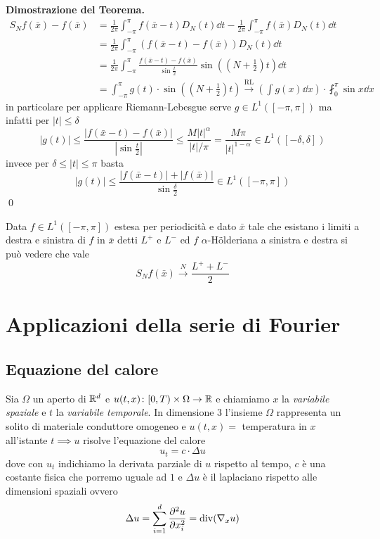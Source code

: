 \textbf{Dimostrazione del Teorema.}
$$
\begin{aligned}
	S_N f(\bar x) - f(\bar x) 
	&= \frac{1}{2\pi} \int_{-\pi}^\pi f(\bar x - t) D_N(t) \dd t - \frac{1}{2\pi} \int_{-\pi}^\pi f(\bar x) D_N(t) \dd t \\
	&= \frac{1}{2\pi} \int_{-\pi}^\pi (f(\bar x - t) - f(\bar x)) D_N(t) \dd t \\
	&= \frac{1}{2\pi} \int_{-\pi}^\pi \frac{f(\bar x - t) - f(\bar x)}{\sin \frac{t}{2}} \sin \left(\left(N + \frac{1}{2}\right) t\right) \dd t \\
	&= \int_{-\pi}^\pi g(t) \cdot \sin \left(\left(N + \frac{1}{2}\right) t\right)
	\xrightarrow{\text{RL}} \left(\int g(x) \dd x\right) \cdot \fint_0^\pi \sin x \dd x
\end{aligned}
$$
in particolare per applicare Riemann-Lebesgue serve $g \in L^1([-\pi, \pi])$ ma infatti per $|t| \leq \delta$
$$
|g(t)| \leq \frac{|f(\bar x - t) - f(\bar x)|}{|\sin \frac{t}{2}|} \leq \frac{M |t|^\alpha}{|t| / \pi} = \frac{M \pi}{|t|^{1 - \alpha}} \in L^1([-\delta, \delta])
$$
invece per $\delta \leq |t| \leq \pi$ basta
$$
|g(t)| \leq \frac{|f(\bar x - t)| + |f(\bar x)|}{\sin \frac{\delta}{2}} \in L^1([-\pi, \pi])
$$
\qed

Data $f \in L^1([-\pi, \pi])$ estesa per periodicità e dato $\bar x$ tale che esistano i limiti a destra e sinistra di $f$ in $\bar x$ detti $L^+$ e $L^-$ ed $f$ $\alpha$-H\"olderiana a sinistra e destra si può vedere che vale
$$
S_N f(\bar x) \xrightarrow{N} \frac{L^+ + L^-}{2}
$$

\chapter{Applicazioni della serie di Fourier}

\section{Equazione del calore}

Sia $\Omega$ un aperto di $\mathbb R^d$ e $u(t, x) \colon [0, T) \times \Omega \to \mathbb R$ e chiamiamo $x$ la \textit{variabile spaziale} e $t$ la \textit{variabile temporale}. In dimensione $3$ l'insieme $\Omega$ rappresenta un solito di materiale conduttore omogeneo  e $u(t, x) = $ temperatura in $x$ all'istante $t \implies u$ risolve l'equazione del calore
$$
u_t = c \cdot \Delta u
$$
dove con $u_t$ indichiamo la derivata parziale di $u$ rispetto al tempo, $c$ è una costante fisica che porremo uguale ad $1$ e $\Delta u$ è il laplaciano rispetto alle dimensioni spaziali ovvero
$$
\Delta u = \sum_{i=1}^d \frac{\partial^2 u}{\partial x_i^2} = \operatorname{div}(\nabla_x u)
$$

